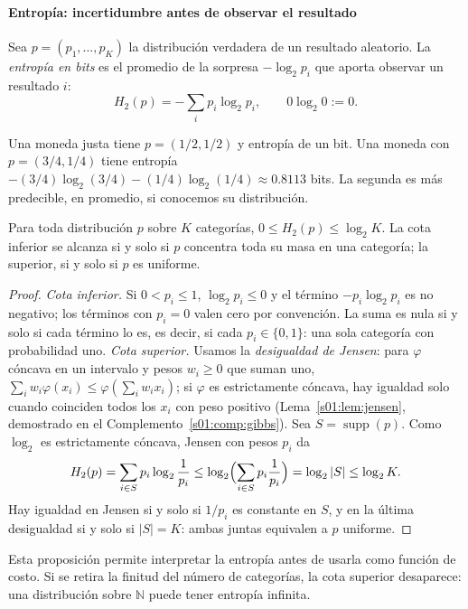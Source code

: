\paragraph{Entropía: incertidumbre antes de observar el resultado}
Sea $p=(p_1,\ldots,p_K)$ la distribución verdadera de un resultado aleatorio. La \emph{entropía en bits} es el promedio de la sorpresa $-\log_2p_i$ que aporta observar un resultado $i$:
\[
H_2(p)=-\sum_i p_i\log_2p_i,\qquad 0\log_2 0:=0.
\]
\begin{ejemplo}
Una moneda justa tiene $p=(1/2,1/2)$ y entropía de un bit. Una moneda con $p=(3/4,1/4)$ tiene entropía
$-(3/4)\log_2(3/4)-(1/4)\log_2(1/4)\approx0.8113$ bits. La segunda es más predecible, en promedio, si conocemos su distribución.
\end{ejemplo}
\begin{proposicion}\label{s01:prop:cotasH}
Para toda distribución $p$ sobre $K$ categorías, $0\le H_2(p)\le\log_2K$. La cota
inferior se alcanza si y solo si $p$ concentra toda su masa en una categoría; la
superior, si y solo si $p$ es uniforme.
\end{proposicion}
\begin{proof}
\emph{Cota inferior.} Si $0<p_i\le1$, $\log_2p_i\le0$ y el término
$-p_i\log_2p_i$ es no negativo; los términos con $p_i=0$ valen cero por
convención. La suma es nula si y solo si cada término lo es, es decir, si cada
$p_i\in\{0,1\}$: una sola categoría con probabilidad uno.
\emph{Cota superior.} Usamos la \emph{desigualdad de Jensen}: para $\varphi$
cóncava en un intervalo y pesos $w_i\ge0$ que suman uno,
$\sum_iw_i\varphi(x_i)\le\varphi(\sum_iw_ix_i)$; si $\varphi$ es estrictamente
cóncava, hay igualdad solo cuando coinciden todos los $x_i$ con peso positivo
(Lema~\ref{s01:lem:jensen}, demostrado en el Complemento~\ref{s01:comp:gibbs}).
Sea $S=\operatorname{supp}(p)$. Como $\log_2$ es estrictamente cóncava, Jensen con
pesos $p_i$ da
\[
H_2(p)=\sum_{i\in S}p_i\log_2\frac1{p_i}\le\log_2\Bigl(\sum_{i\in S}p_i\frac1{p_i}\Bigr)
=\log_2|S|\le\log_2K.
\]
Hay igualdad en Jensen si y solo si $1/p_i$ es constante en $S$, y en la última
desigualdad si y solo si $|S|=K$: ambas juntas equivalen a $p$ uniforme.
\end{proof}
\noindent Esta proposición permite interpretar la entropía antes de usarla como
función de costo. Si se retira la finitud del número de categorías, la cota
superior desaparece: una distribución sobre $\mathbb N$ puede tener entropía
infinita.
